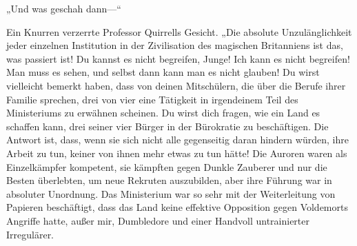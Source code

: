 „Und was geschah dann—“

Ein Knurren verzerrte Professor Quirrells Gesicht. „Die absolute Unzulänglichkeit jeder einzelnen Institution in der Zivilisation des magischen Britanniens ist das, was passiert ist! Du kannst es nicht begreifen, Junge! Ich kann es nicht begreifen! Man muss es sehen, und selbst dann kann man es nicht glauben! Du wirst vielleicht bemerkt haben, dass von deinen Mitschülern, die über die Berufe ihrer Familie sprechen, drei von vier eine Tätigkeit in irgendeinem Teil des Ministeriums zu erwähnen scheinen. Du wirst dich fragen, wie ein Land es schaffen kann, drei seiner vier Bürger in der Bürokratie zu beschäftigen. Die Antwort ist, dass, wenn sie sich nicht alle gegenseitig daran hindern würden, ihre Arbeit zu tun, keiner von ihnen mehr etwas zu tun hätte! Die Auroren waren als Einzelkämpfer kompetent, sie kämpften gegen Dunkle Zauberer und nur die Besten überlebten, um neue Rekruten auszubilden, aber ihre Führung war in absoluter Unordnung. Das Ministerium war so sehr mit der Weiterleitung von Papieren beschäftigt, dass das Land keine effektive Opposition gegen Voldemorts Angriffe hatte, außer mir, Dumbledore und einer Handvoll untrainierter Irregulärer.
